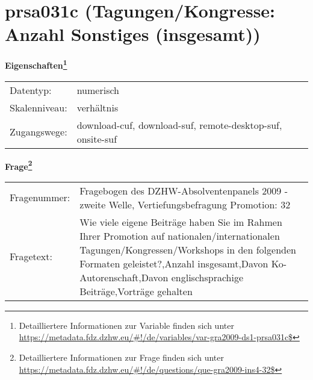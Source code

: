 
    \setcounter{footnote}{0}

    \vspace*{-1.8cm}
	\section{prsa031c (Tagungen/Kongresse: Anzahl Sonstiges (insgesamt))}
	\label{section:prsa031c}



    \vspace*{0.5cm}
    \noindent\textbf{Eigenschaften\footnote{Detailliertere Informationen zur Variable finden sich unter
		\url{https://metadata.fdz.dzhw.eu/\#!/de/variables/var-gra2009-ds1-prsa031c$}}}\\
	\begin{tabularx}{\hsize}{@{}lX}
	Datentyp: & numerisch \\
	Skalenniveau: & verhältnis \\
	Zugangswege: &
	  download-cuf, 
	  download-suf, 
	  remote-desktop-suf, 
	  onsite-suf
 \\
    \end{tabularx}



				\vspace*{0.5cm}
                \noindent\textbf{Frage\footnote{Detailliertere Informationen zur Frage finden sich unter
		              \url{https://metadata.fdz.dzhw.eu/\#!/de/questions/que-gra2009-ins4-32$}}}\\
				\begin{tabularx}{\hsize}{@{}lX}
					Fragenummer: &
					  Fragebogen des DZHW-Absolventenpanels 2009 - zweite Welle, Vertiefungsbefragung Promotion:
					  32
 \\
					Fragetext: & Wie viele eigene Beiträge haben Sie im Rahmen Ihrer Promotion auf nationalen/internationalen Tagungen/Kongressen/Workshops in den folgenden Formaten geleistet?,Anzahl insgesamt,Davon Ko-Autorenschaft,Davon englischsprachige Beiträge,Vorträge gehalten \\
				\end{tabularx}





